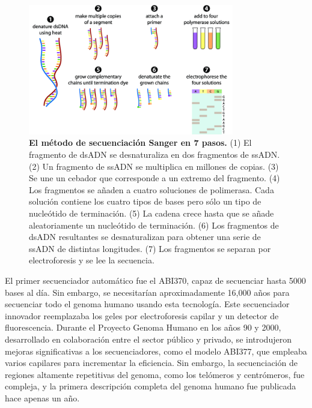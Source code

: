 \begin{figure}[htbp]
\centering
\includegraphics[width = 0.8\textwidth]{figs/sanger.png}
\caption{\textbf{El método de secuenciación Sanger en 7 pasos.} (1) El fragmento de dsADN se desnaturaliza en dos fragmentos de ssADN. (2) Un fragmento de ssADN se multiplica en millones de copias. (3) Se une un cebador que corresponde a un extremo del fragmento. (4) Los fragmentos se añaden a cuatro soluciones de polimerasa. Cada solución contiene los cuatro tipos de bases pero sólo un tipo de nucleótido de terminación. (5) La cadena crece hasta que se añade aleatoriamente un nucleótido de terminación. (6) Los fragmentos de dsADN resultantes se desnaturalizan para obtener una serie de ssADN de distintas longitudes. (7) Los fragmentos se separan por electroforesis y se lee la secuencia.}
\end{figure}

El primer secuenciador automático fue el ABI370, capaz de secuenciar hasta 5000 bases al día. Sin embargo, se necesitarían aproximadamente 16,000 años para secuenciar todo el genoma humano usando esta tecnología. Este secuenciador innovador reemplazaba los geles por electroforesis capilar y un detector de fluorescencia. Durante el Proyecto Genoma Humano en los años 90 y 2000, desarrollado en colaboración entre el sector público y privado, se introdujeron mejoras significativas a los secuenciadores, como el modelo ABI377, que empleaba varios capilares para incrementar la eficiencia. Sin embargo, la secuenciación de regiones altamente repetitivas del genoma, como los telómeros y centrómeros, fue compleja, y la primera descripción completa del genoma humano fue publicada hace apenas un año.

